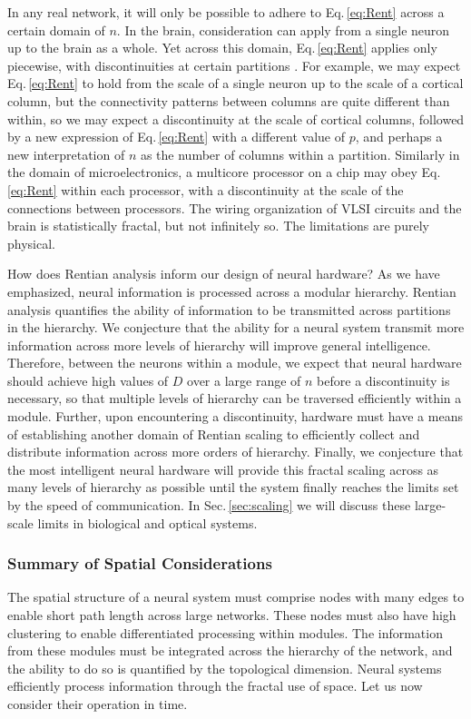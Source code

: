 In any real network, it will only be possible to adhere to Eq.\,\ref{eq:Rent} across a certain domain of $n$. In the brain, consideration can apply from a single neuron up to the brain as a whole. Yet across this domain, Eq.\,\ref{eq:Rent} applies only piecewise, with discontinuities at certain partitions \cite{oz2004}. For example, we may expect Eq.\,\ref{eq:Rent} to hold from the scale of a single neuron up to the scale of a cortical column, but the connectivity patterns between columns are quite different than within, so we may expect a discontinuity at the scale of cortical columns, followed by a new expression of Eq.\,\ref{eq:Rent} with a different value of $p$, and perhaps a new interpretation of $n$ as the number of columns within a partition. Similarly in the domain of microelectronics, a multicore processor on a chip may obey Eq.\,\ref{eq:Rent} within each processor, with a discontinuity at the scale of the connections between processors. The wiring organization of VLSI circuits and the brain is statistically fractal, but not infinitely so. The limitations are purely physical.  

How does Rentian analysis inform our design of neural hardware? As we have emphasized, neural information is processed across a modular hierarchy. Rentian analysis quantifies the ability of information to be transmitted across partitions in the hierarchy. We conjecture that the ability for a neural system transmit more information across more levels of hierarchy will improve general intelligence. Therefore, between the neurons within a module, we expect that neural hardware should achieve high values of $D$ over a large range of $n$ before a discontinuity is necessary, so that multiple levels of hierarchy can be traversed efficiently within a module. Further, upon encountering a discontinuity, hardware must have a means of establishing another domain of Rentian scaling to efficiently collect and distribute information across more orders of hierarchy. Finally, we conjecture that the most intelligent neural hardware will provide this fractal scaling across as many levels of hierarchy as possible until the system finally reaches the limits set by the speed of communication. In Sec.\,\ref{sec:scaling} we will discuss these large-scale limits in biological and optical systems.

\subsubsection{Summary of Spatial Considerations}
The spatial structure of a neural system must comprise nodes with many edges to enable short path length across large networks. These nodes must also have high clustering to enable differentiated processing within modules. The information from these modules must be integrated across the hierarchy of the network, and the ability to do so is quantified by the topological dimension. Neural systems efficiently process information through the fractal use of space. Let us now consider their operation in time.

